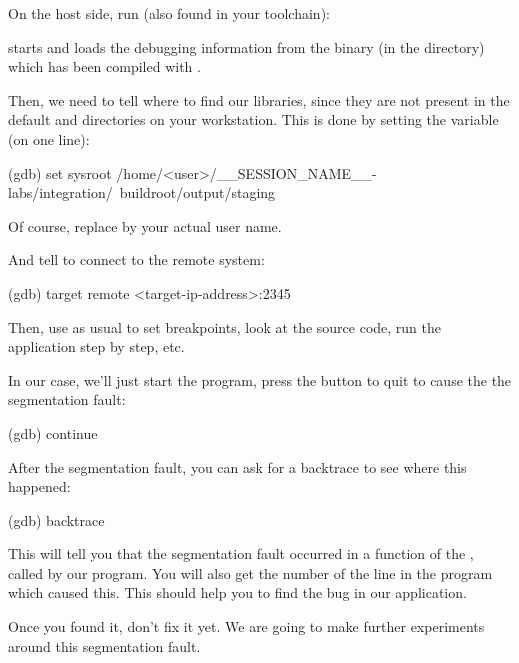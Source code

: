 On the host side, run  (also found in your toolchain):
\begin{bashinput}
$ %
\end{bashinput}

 starts and loads the debugging information from the
 binary (in the  directory)
which has been compiled with .

Then, we need to tell where to find our libraries, since they are not
present in the default  and  directories on
your workstation. This is done by setting the  
variable (on one line):

\begin{bashinput}
(gdb) set sysroot /home/<user>/__SESSION_NAME__-labs/integration/\
    buildroot/output/staging
\end{bashinput}

Of course, replace  by your actual user name.

And tell  to connect to the remote system:
\begin{bashinput}
(gdb) target remote <target-ip-address>:2345
\end{bashinput}

Then, use  as usual to set breakpoints, look at the source
code, run the application step by step, etc.

In our case, we'll just start the program, press the  button
to quit to cause the the segmentation fault:
\begin{bashinput}
(gdb) continue
\end{bashinput}

After the segmentation fault, you can ask for a backtrace to see
where this happened:
\begin{bashinput}
(gdb) backtrace
\end{bashinput}

This will tell you that the segmentation fault occurred in a function
of the \code{libmpdclient}, called by our program. You will also get
the number of the line in the program which caused this. This should
help you to find the bug in our application.

Once you found it, don't fix it yet. We are going to make further
experiments around this segmentation fault.

